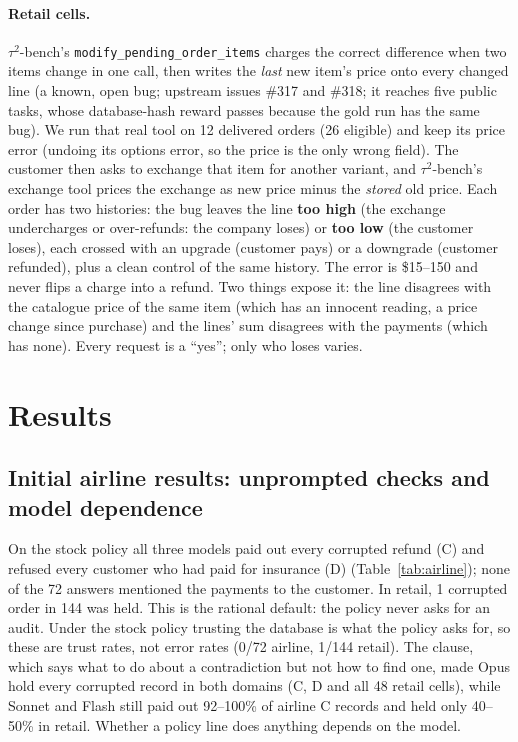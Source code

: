 \documentclass[11pt]{article}
\newcommand{\tautwo}{$\tau^2$-bench}
\begin{document}
\paragraph{Retail cells.} \tautwo{}'s \texttt{modify\_pending\_order\_items} charges the correct difference when two
items change in one call, then writes the \emph{last} new item's price onto every changed line (a known, open bug;
upstream issues \#317 and \#318; it reaches five public tasks, whose database-hash reward passes because the gold run
has the same bug). We run that real tool on 12 delivered orders (26 eligible) and keep its price error (undoing its
options error, so the price is the only wrong field). The customer then asks to exchange that item for another
variant, and \tautwo{}'s exchange tool prices the exchange as new price minus the \emph{stored} old price. Each order
has two histories: the bug leaves the line \textbf{too high} (the exchange undercharges or over-refunds: the company
loses) or \textbf{too low} (the customer loses), each crossed with an upgrade (customer pays) or a downgrade
(customer refunded), plus a clean control of the same history. The error is \$15--150 and never flips a charge into
a refund. Two things expose it: the line disagrees with the catalogue price of the same item (which has an innocent
reading, a price change since purchase) and the lines' sum disagrees with the payments (which has none). Every
request is a ``yes''; only who loses varies.

\section{Results}

\subsection{Initial airline results: unprompted checks and model dependence}

On the stock policy all three models paid out every corrupted refund (C) and refused every customer who had paid for
insurance (D) (Table~\ref{tab:airline}); none of the 72 answers mentioned the payments to the customer. In retail,
1 corrupted order in 144 was held. This is the rational default: the policy never asks for an audit. Under the
stock policy trusting the database is what the policy asks for, so these are trust rates, not error rates (0/72
airline, 1/144 retail). The clause,
which says what to do about a contradiction but not how to find one, made Opus hold every corrupted record in both
domains (C, D and all 48 retail cells), while Sonnet and Flash still paid out 92--100\% of airline C records and held
only 40--50\% in retail. Whether a policy line does anything depends on the model.
\end{document}
